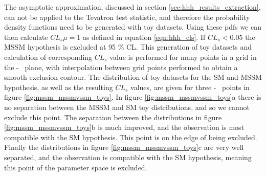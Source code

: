 The asymptotic approximation, discussed in section \ref{sec:hhh_results_extraction}, can not be applied
to the Tevatron test statistic, and therefore the probability density functions need to be generated 
with toy datasets. Using these pdfs we can then calculate $CL_s{\mu=1}$ as defined in equation \ref{eqn:hhh_cls}.
If $CL_s < 0.05$ the MSSM hypothesis is excluded at 95 \% CL. This generation of toy datasets and 
calculation of corresponding $CL_s$ value is performed for many points in a grid in the \mA-\tanb~ plane,
with interpolation between grid points performed to obtain a smooth exclusion contour.
The distribution of toy datasets for the SM and MSSM hypothesis, as well as the resulting $CL_s$ values,
are given for three \mA-\tanb~ points in figure \ref{fig:mssm_mssmvssm_toys}. In figure \ref{fig:mssm_mssmvssm_toys}a
there is no separation between the MSSM and SM toy distributions, and so we cannot exclude this point. The separation
between the distributions in figure \ref{fig:mssm_mssmvssm_toys}b is much improved, and the observation is most compatible
with the SM hypothesis. This point is on the edge of being excluded. Finally the distributions in figure \ref{fig:mssm_mssmvssm_toys}c
are very well separated, and the observation is compatible with the SM hypothesis, meaning this point of the parameter space is excluded.

